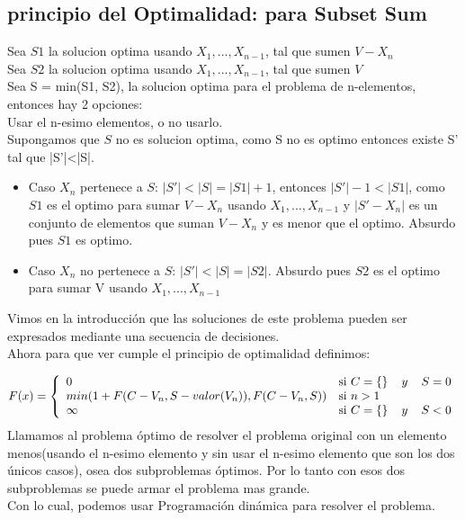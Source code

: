 \subsection{principio del Optimalidad: para Subset Sum}
Sea $S1$ la solucion optima usando $X_{1},...,X_{n-1}$, tal que sumen $V-X_{n}$\\
Sea $S2$ la solucion optima usando $X_{1},...,X_{n-1}$, tal que sumen $V$\\
Sea S = min(S1, S2), la solucion optima para el problema de n-elementos, entonces hay 2 opciones:\\
Usar el n-esimo elementos, o no usarlo.\\
Supongamos que $S$ no es solucion optima, como S no es optimo entonces existe S' tal que |S'|<|S|.\\
\begin{itemize}
    \item Caso $X_{n}$ pertenece a $S$: $|S'| < |S| = |S1|+1$, entonces $|S'|-1 < |S1|$, como $S1$ es el optimo para sumar $V-X_{n}$ usando $X_{1},...,X_{n-1}$ y $|S'-X_{n}|$ es un conjunto de elementos que suman $V-X_{n}$ y es menor que el optimo. Absurdo pues $S1$ es optimo.
    \item Caso $X_{n}$ no pertenece a $S$: $|S'| < |S| = |S2|$. Absurdo pues $S2$ es el optimo para sumar V usando $X_{1},...,X_{n-1}$ 
\end{itemize}
Vimos en la introducci\'on que las soluciones de este problema pueden ser expresados mediante una secuencia de decisiones.\\
Ahora para que ver cumple el principio de optimalidad definimos:

 \begin{equation}
     \label{eq:F-recursiva}
     F(x) = \left\{
	       \begin{array}{ll}
		 0      & \mathrm{si\ }  C = \{\} \hspace{4mm} y\hspace{4mm} S = 0\\
		 min(1+F(C-V_{n},S-valor(V_{n})),F(C-V_{n},S)) & \mathrm{si\ } n > 1 \\
		 \infty     & \mathrm{si\ } C = \{\} \hspace{4mm} y \hspace{4mm} S < 0
	       \end{array}
	     \right.
   \end{equation}
Llamamos al problema \'optimo de resolver el problema original con un elemento menos(usando el n-esimo elemento y sin usar el n-esimo elemento que son los dos \'unicos casos), osea dos subproblemas \'optimos. Por lo tanto con esos dos subproblemas se puede armar el problema mas grande.\\
Con lo cual, podemos usar Programaci\'on din\'amica para resolver el problema.

